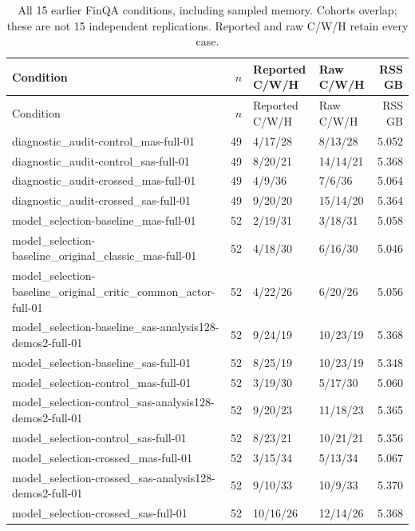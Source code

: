 \begin{longtable}{p{}rllr}
\caption{All 15 earlier FinQA conditions, including sampled memory. Cohorts overlap; these are not 15 independent replications. Reported and raw C/W/H retain every case.}\label{tab:historical-conditions}\\
Condition & $n$ & Reported C/W/H & Raw C/W/H & RSS GB\\\toprule\endfirsthead
Condition & $n$ & Reported C/W/H & Raw C/W/H & RSS GB\\\toprule\endhead
diagnostic\_audit-control\_mas-full-01 & 49 & 4/17/28 & 8/13/28 & 5.052\\
diagnostic\_audit-control\_sas-full-01 & 49 & 8/20/21 & 14/14/21 & 5.368\\
diagnostic\_audit-crossed\_mas-full-01 & 49 & 4/9/36 & 7/6/36 & 5.064\\
diagnostic\_audit-crossed\_sas-full-01 & 49 & 9/20/20 & 15/14/20 & 5.364\\
model\_selection-baseline\_mas-full-01 & 52 & 2/19/31 & 3/18/31 & 5.058\\
model\_selection-baseline\_original\_classic\_mas-full-01 & 52 & 4/18/30 & 6/16/30 & 5.046\\
model\_selection-baseline\_original\_critic\_common\_actor-full-01 & 52 & 4/22/26 & 6/20/26 & 5.056\\
model\_selection-baseline\_sas-analysis128-demos2-full-01 & 52 & 9/24/19 & 10/23/19 & 5.368\\
model\_selection-baseline\_sas-full-01 & 52 & 8/25/19 & 10/23/19 & 5.348\\
model\_selection-control\_mas-full-01 & 52 & 3/19/30 & 5/17/30 & 5.060\\
model\_selection-control\_sas-analysis128-demos2-full-01 & 52 & 9/20/23 & 11/18/23 & 5.365\\
model\_selection-control\_sas-full-01 & 52 & 8/23/21 & 10/21/21 & 5.356\\
model\_selection-crossed\_mas-full-01 & 52 & 3/15/34 & 5/13/34 & 5.067\\
model\_selection-crossed\_sas-analysis128-demos2-full-01 & 52 & 9/10/33 & 10/9/33 & 5.370\\
model\_selection-crossed\_sas-full-01 & 52 & 10/16/26 & 12/14/26 & 5.368\\
\bottomrule\end{longtable}